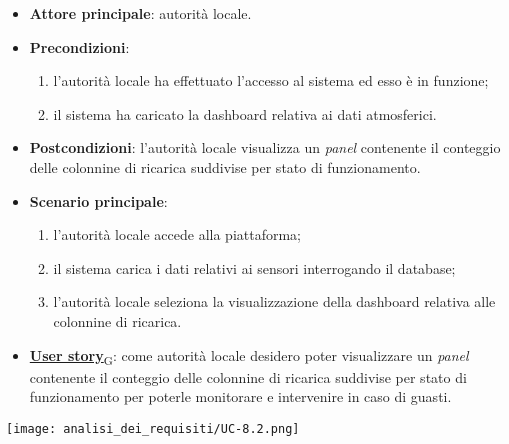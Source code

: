 \begin{itemize}
	\item \textbf{Attore principale}: autorità locale.
	\item \textbf{Precondizioni}:
	      \begin{enumerate}
		      \item l'autorità locale ha effettuato l'accesso al sistema ed esso è in funzione;
		      \item il sistema ha caricato la dashboard relativa ai dati atmosferici.
	      \end{enumerate}
	\item \textbf{Postcondizioni}: l'autorità locale visualizza un \textit{panel} contenente il conteggio delle colonnine di ricarica suddivise per stato di funzionamento.
	\item \textbf{Scenario principale}:
	      \begin{enumerate}
		      \item l'autorità locale accede alla piattaforma;
		      \item il sistema carica i dati relativi ai sensori interrogando il database;
		      \item l'autorità locale seleziona la visualizzazione della dashboard relativa alle colonnine di ricarica.
	      \end{enumerate}
	\item \href{https://7last.github.io/docs/rtb/documentazione-interna/glossario\#user-story}{\textbf{User story}\textsubscript{G}}:
	      come autorità locale desidero poter visualizzare un \textit{panel} contenente il conteggio delle colonnine di ricarica suddivise per stato di funzionamento
	      per poterle monitorare e intervenire in caso di guasti.
\end{itemize}
\begin{center}
	\texttt{[image: analisi\_dei\_requisiti/UC-8.2.png]}
\end{center}

